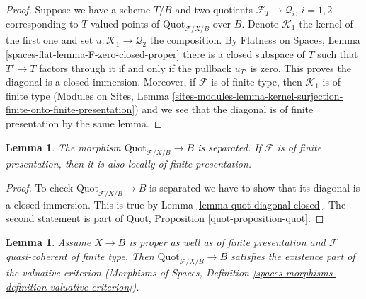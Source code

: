 \documentclass{stacks-project}
\theoremstyle{plain}
\newtheorem{lemma}[subsection]{Lemma}
\theoremstyle{definition}
\theoremstyle{remark}
\numberwithin{equation}{subsection}
\def\Quotfunctor{\mathrm{Quot}}
\begin{document}
\begin{proof}
Suppose we have a scheme $T/B$ and two quotients
$\mathcal{F}_T \to \mathcal{Q}_i$, $i = 1, 2$ corresponding
to $T$-valued points of $\Quotfunctor_{\mathcal{F}/X/B}$ over $B$.
Denote $\mathcal{K}_1$ the kernel of the first one and set
$u : \mathcal{K}_1 \to \mathcal{Q}_2$ the composition.
By Flatness on Spaces, Lemma \ref{spaces-flat-lemma-F-zero-closed-proper}
there is a closed subspace of $T$ such that $T' \to T$
factors through it if and only if the pullback $u_{T'}$ is zero.
This proves the diagonal is a closed immersion.
Moreover, if $\mathcal{F}$ is of finite type, then
$\mathcal{K}_1$ is of finite type
(Modules on Sites, Lemma
\ref{sites-modules-lemma-kernel-surjection-finite-onto-finite-presentation})
and we see that the diagonal is of finite presentation by
the same lemma.
\end{proof}

\begin{lemma}
\label{lemma-quot-s-lfp}
The morphism $\Quotfunctor_{\mathcal{F}/X/B} \to B$ is separated.
If $\mathcal{F}$ is of finite presentation, then it is also
locally of finite presentation.
\end{lemma}

\begin{proof}
To check $\Quotfunctor_{\mathcal{F}/X/B} \to B$ is separated we have to
show that its diagonal is a closed immersion. This
is true by Lemma \ref{lemma-quot-diagonal-closed}.
The second statement is part of
Quot, Proposition \ref{quot-proposition-quot}.
\end{proof}

\begin{lemma}
\label{lemma-quot-existence-part}
Assume $X \to B$ is proper as well as of finite presentation
and $\mathcal{F}$ quasi-coherent of finite type.
Then $\Quotfunctor_{\mathcal{F}/X/B} \to B$ satisfies the existence part
of the valuative criterion (Morphisms of Spaces, Definition
\ref{spaces-morphisms-definition-valuative-criterion}).
\end{lemma}
\end{document}

